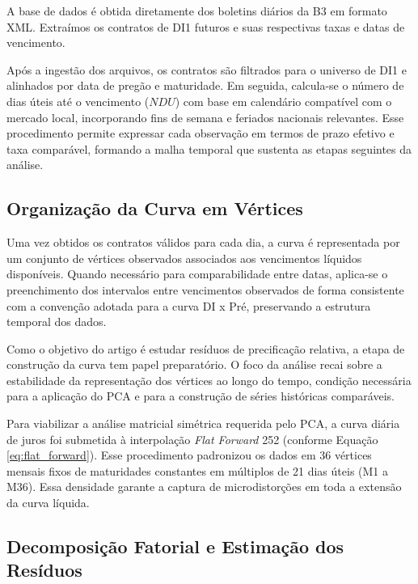 \documentclass[fleqn]{rbfin}
\begin{document}
A base de dados é obtida diretamente dos boletins diários da B3 em formato XML. Extraímos os contratos de DI1 futuros e suas respectivas taxas e datas de vencimento.


Após a ingestão dos arquivos, os contratos são filtrados para o universo de DI1 e alinhados por data de pregão e maturidade. Em seguida, calcula-se o número de dias úteis até o vencimento ($NDU$) com base em calendário compatível com o mercado local, incorporando fins de semana e feriados nacionais relevantes. Esse procedimento permite expressar cada observação em termos de prazo efetivo e taxa comparável, formando a malha temporal que sustenta as etapas seguintes da análise.

\subsection{Organização da Curva em Vértices}

Uma vez obtidos os contratos válidos para cada dia, a curva é representada por um conjunto de vértices observados associados aos vencimentos líquidos disponíveis. Quando necessário para comparabilidade entre datas, aplica-se o preenchimento dos intervalos entre vencimentos observados de forma consistente com a convenção adotada para a curva DI x Pré, preservando a estrutura temporal dos dados.

Como o objetivo do artigo é estudar resíduos de precificação relativa, a etapa de construção da curva tem papel preparatório. O foco da análise recai sobre a estabilidade da representação dos vértices ao longo do tempo, condição necessária para a aplicação do PCA e para a construção de séries históricas comparáveis.

Para viabilizar a análise matricial simétrica requerida pelo PCA, a curva diária de juros foi submetida à interpolação \textit{Flat Forward} 252 (conforme Equação \ref{eq:flat_forward}). Esse procedimento padronizou os dados em 36 vértices mensais fixos de maturidades constantes em múltiplos de 21 dias úteis (M1 a M36). Essa densidade garante a captura de microdistorções em toda a extensão da curva líquida.


\subsection{Decomposição Fatorial e Estimação dos Resíduos}
\end{document}
